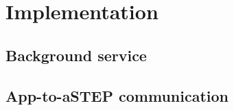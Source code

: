 \section{Implementation}

\subsection{Background service}



\subsection{App-to-aSTEP communication}
